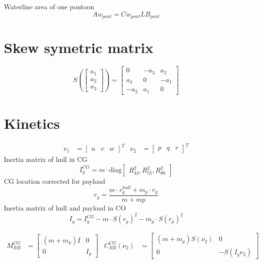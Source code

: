 \documentclass[12pt,a4]{article}
\begin{document}
Waterline area of one pontoon
\begin{equation}
	Aw_{pont} = Cw_{pont} L B_{pont}
\end{equation}

\section{Skew symetric matrix}

\begin{equation}
	S\left(\begin{bmatrix}a_1\\a_2\\a_3\end{bmatrix}\right) =
	\begin{bmatrix}
		0    & -a_3 & a_2  \\
		a_3  & 0    & -a_1 \\
		-a_2 & a_1  & 0
	\end{bmatrix}
\end{equation}


\section{Kinetics}
\begin{align}
	\nu_1 & = \begin{bmatrix}u & v & w\end{bmatrix}^T & \nu_2 & = \begin{bmatrix}p & q & r\end{bmatrix}^T
\end{align}
Inertia matrix of hull in CG
\begin{equation}
	I_g^{CG} = m \cdot \text{diag}\begin{bmatrix}R_{44}^2, R_{55}^2, R_{66}^2\end{bmatrix}
\end{equation}
CG location corrected for payload
\begin{equation}
	r_g = \frac{m \cdot r_g^{hull} + m_p \cdot r_p}{m+mp}
\end{equation}
Inertia matrix of hull and payload in CO
\begin{equation}
	I_g = I_g^{CG} - m \cdot S(r_g)^2 - m_p \cdot S(r_p)^2
\end{equation}




\begin{align}
	M_{RB}^{CG}                & =
	\begin{bmatrix}
		(m+m_p)I & 0   \\
		0        & I_g
	\end{bmatrix} &
	C_{RB}^{CG}(\nu_2)         & =
	\begin{bmatrix}
		(m+m_p) S(\nu_2) & 0             \\
		0                & -S(I_g \nu_2)
	\end{bmatrix}
\end{align}
\end{document}
